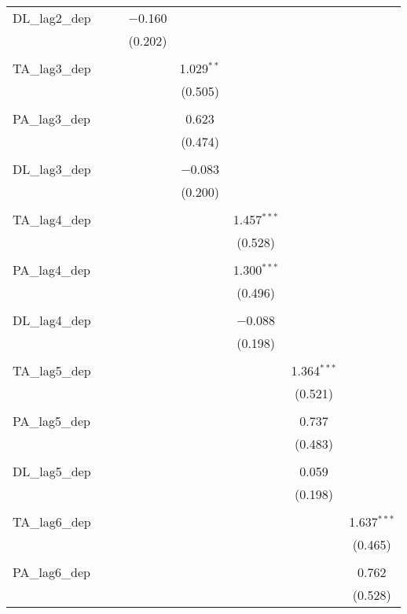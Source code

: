 \begin{table}[!htbp]
\begin{tabular}{@{\extracolsep{5pt}}lccccccc}
 DL\_lag2\_dep &  &  & $-$0.160 &  &  &  &  \\ 
  &  &  & (0.202) &  &  &  &  \\ 
  & & & & & & & \\ 
 TA\_lag3\_dep &  &  &  & 1.029$^{**}$ &  &  &  \\ 
  &  &  &  & (0.505) &  &  &  \\ 
  & & & & & & & \\ 
 PA\_lag3\_dep &  &  &  & 0.623 &  &  &  \\ 
  &  &  &  & (0.474) &  &  &  \\ 
  & & & & & & & \\ 
 DL\_lag3\_dep &  &  &  & $-$0.083 &  &  &  \\ 
  &  &  &  & (0.200) &  &  &  \\ 
  & & & & & & & \\ 
 TA\_lag4\_dep &  &  &  &  & 1.457$^{***}$ &  &  \\ 
  &  &  &  &  & (0.528) &  &  \\ 
  & & & & & & & \\ 
 PA\_lag4\_dep &  &  &  &  & 1.300$^{***}$ &  &  \\ 
  &  &  &  &  & (0.496) &  &  \\ 
  & & & & & & & \\ 
 DL\_lag4\_dep &  &  &  &  & $-$0.088 &  &  \\ 
  &  &  &  &  & (0.198) &  &  \\ 
  & & & & & & & \\ 
 TA\_lag5\_dep &  &  &  &  &  & 1.364$^{***}$ &  \\ 
  &  &  &  &  &  & (0.521) &  \\ 
  & & & & & & & \\ 
 PA\_lag5\_dep &  &  &  &  &  & 0.737 &  \\ 
  &  &  &  &  &  & (0.483) &  \\ 
  & & & & & & & \\ 
 DL\_lag5\_dep &  &  &  &  &  & 0.059 &  \\ 
  &  &  &  &  &  & (0.198) &  \\ 
  & & & & & & & \\ 
 TA\_lag6\_dep &  &  &  &  &  &  & 1.637$^{***}$ \\ 
  &  &  &  &  &  &  & (0.465) \\ 
  & & & & & & & \\ 
 PA\_lag6\_dep &  &  &  &  &  &  & 0.762 \\ 
  &  &  &  &  &  &  & (0.528) \\ 

\end{tabular}
\end{table}
